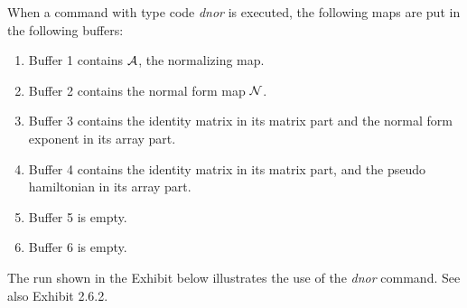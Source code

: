      When a command with type code {\em dnor } is executed, the following maps
are put in the following buffers:
\begin{enumerate}
           \item  Buffer 1 contains ${\cal A}$, the normalizing map.

           \item  Buffer 2 contains the normal form map ${\cal N}$.

		   \item  Buffer 3 contains the identity matrix in its matrix part and the
		          normal form exponent in its array part.

           \item  Buffer 4 contains the identity matrix in its matrix part,
                  and the pseudo hamiltonian in its array part.

           \item  Buffer 5 is empty.

		   \item  Buffer 6 is empty.
\end{enumerate}

The \Mary run shown in the Exhibit below illustrates the use of the {\em dnor} command.  See also Exhibit 2.6.2.

